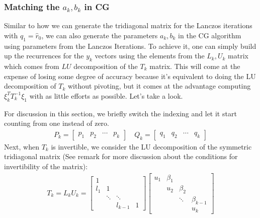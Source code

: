 \documentclass[]{article}
\theoremstyle{definition}
\begin{document}
        \subsubsection{Matching the $a_k, b_k$ in CG}
            Similar to how we can generate the tridiagonal matrix for the Lanczos iterations with $q_1 = \hat{r}_0$, we can also generate the parameters $a_k, b_k$ in the CG algorithm using parameters from the Lanczos Iterations. To achieve it, one can simply build up the recurrences for the $y_k$ vectors using the elements from the $L_k, U_k$ matrix which comes from $LU$ decomposition of the $T_k$ matrix. This will come at the expense of losing some degree of accuracy because it's equivalent to doing the LU decomposition of $T_k$ without pivoting, but it comes at the advantage computing $\xi_k^TT_k^{-1}\xi_1$  with as little efforts as possible. Let's take a look. 
            \par
            For discussion in this section, we briefly switch the indexing and let it start counting from one instead of zero. 
            \begin{align}
                P_k = \begin{bmatrix}
                    p_1 & p_2& \cdots & p_k
                \end{bmatrix} \quad
                Q_k = \begin{bmatrix}
                    q_1 & q_2 & \cdots & q_k
                \end{bmatrix}
            \end{align}
            Next, when $T_k$ is invertible, we consider the LU decomposition of the symmetric tridiagonal matrix (See remark for more discussion about the conditions for invertibility of the matrix): 
            \begin{align}
                T_k = L_k U_k =
                \begin{bmatrix}
                    1 & & & \\
                    l_1 & 1 & & \\
                    & \ddots& \ddots & 
                    \\
                    & & l_{k - 1} & 1
                \end{bmatrix}\begin{bmatrix}
                    u_1& \beta_1 & & \\
                    & u_2 &\beta_2 & \\
                    & &\ddots & \beta_{k - 1}\\
                    & & & u_k
                \end{bmatrix}
            \end{align}
\end{document}
